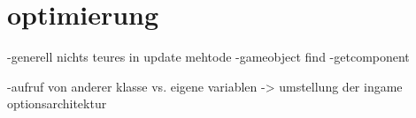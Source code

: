 

\section{optimierung}
-generell nichts teures in update mehtode
-gameobject find
-getcomponent

-aufruf von anderer klasse vs. eigene variablen -> umstellung der ingame optionsarchitektur
